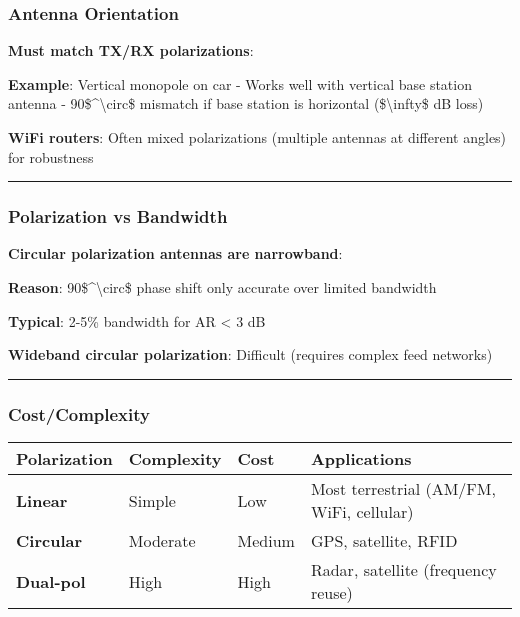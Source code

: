 \subsubsection{Antenna Orientation}\label{antenna-orientation}

\textbf{Must match TX/RX polarizations}:

\textbf{Example}: Vertical monopole on car - Works well with vertical
base station antenna - 90\$\^{}\textbackslash circ\$ mismatch if base
station is horizontal (\$\textbackslash infty\$ dB loss)

\textbf{WiFi routers}: Often mixed polarizations (multiple antennas at
different angles) for robustness

\begin{center}\rule{0.5\linewidth}{0.5pt}\end{center}

\subsubsection{Polarization vs
Bandwidth}\label{polarization-vs-bandwidth}

\textbf{Circular polarization antennas are narrowband}:

\textbf{Reason}: 90\$\^{}\textbackslash circ\$ phase shift only accurate
over limited bandwidth

\textbf{Typical}: 2-5\% bandwidth for AR \textless{} 3 dB

\textbf{Wideband circular polarization}: Difficult (requires complex
feed networks)

\begin{center}\rule{0.5\linewidth}{0.5pt}\end{center}

\subsubsection{Cost/Complexity}\label{costcomplexity}

{\def\LTcaptype{} %
\begin{longtable}[]{@{}llll@{}}
\toprule\noalign{}
Polarization & Complexity & Cost & Applications \\
\midrule\noalign{}
\endhead
\bottomrule\noalign{}
\endlastfoot
\textbf{Linear} & Simple & Low & Most terrestrial (AM/FM, WiFi,
cellular) \\
\textbf{Circular} & Moderate & Medium & GPS, satellite, RFID \\
\textbf{Dual-pol} & High & High & Radar, satellite (frequency reuse) \\
\end{longtable}
}


